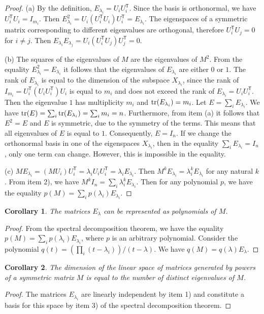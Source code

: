 \documentclass[11pt]{article}
\newtheorem{corollary}{Corollary}[section]
\theoremstyle{definition}
\newcommand{\tr}{{\rm tr}}
\begin{document}
\begin{proof}

(a) By the definition, $E_{\lambda_i}=U_i U_i^{\mathsf T}$. Since the basis is orthonormal, we have $U_i^{\mathsf T}U_i=I_{m_i}$. Then $E^2_{\lambda_i}=
U_i(U_i^{\mathsf T}U_i) U_i^{\mathsf T}= E_{\lambda_i}$. The eigenspaces
of a symmetric matrix corresponding to different eigenvalues
are orthogonal, therefore $U_i^{\mathsf T}U_j=0$ for $i\neq j$. Then
$E_{\lambda_i}E_{\lambda_j}=U_i(U_i^{\mathsf T}U_j) U_j^{\mathsf T}=0$.

(b) The squares of the eigenvalues of  $M$ are the eigenvalues
of  $M^2$. From the equality $E^2_{\lambda_i}=E_{\lambda_i}$
it follows that the eigenvalues of  $E_{\lambda_i}$ are either $0$ or
$1$. The rank of  $E_{\lambda_i}$ is equal to the dimension of the subspace
$X_{\lambda_i}$, since the rank of  $I_{m_i}=U_i^{\mathsf T}(U_iU_i^{\mathsf T})U_i$
is equal to $m_i$ and does not exceed the rank of  $E_{\lambda_i}=U_i
U_i^{\mathsf T}$. Then the eigenvalue $1$ has multiplicity $m_i$ and
$\tr(E_{\lambda_i})= m_i$. Let $E=\sum_iE_{\lambda_i}$. We have
$\tr(E)=\sum_i\tr(E_{\lambda_i})=\sum_im_i=n$. Furthermore, from item (a)
it follows that $E^2=E$ and  $E$ is symmetric, due to
the symmetry of the terms. This means that all  eigenvalues of $E$ is equal to $1$. Consequently, $E=I_n$. If we change
the orthonormal basis in one of the eigenspaces
$X_{\lambda_i}$, then in the equality $\sum_iE_{\lambda_i}=I_n$, only one term can
change. However, this is impossible in the equality.

(c) $ME_{\lambda_i}=(MU_i) U_i^{\mathsf T}=\lambda_i
U_iU_i^{\mathsf T}=\lambda_iE_{\lambda_i}$. Then
$M^kE_{\lambda_i}=\lambda^k_iE_{\lambda_i}$ for any natural
$k$. From item 2), we have $M^kI_n= \sum_i\lambda^k_iE_{\lambda_i}$. Then
for any polynomial $p$, we have the equality
$p(M)=\sum_ip(\lambda_i)E_{\lambda_i}$.
\end{proof}

\begin{corollary}\label{colE}
The matrices
$E_\lambda$ can be represented as polynomials of
$M$. \end{corollary}
\begin{proof}
From the spectral decomposition theorem, we have the equality $p(M)=\sum_i
p(\lambda_i)E_{\lambda_i}$, where $p$ is an arbitrary polynomial.
Consider the polynomial $q(t)=(\prod_i(t-\lambda_i))/(t-\lambda)$. We have
$q(M)=q(\lambda)E_\lambda$.
\end{proof}

{
\begin{corollary}\label{corEM}
The dimension of the linear space of matrices generated by powers
of a symmetric matrix $M$ is equal to the number of distinct eigenvalues
of $M$. \end{corollary}
\begin{proof}
The matrices $E_{\lambda_i}$ are linearly independent by item 1) and constitute a basis for this space by item 3) of the spectral decomposition theorem.
\end{proof}
}
\end{document}
